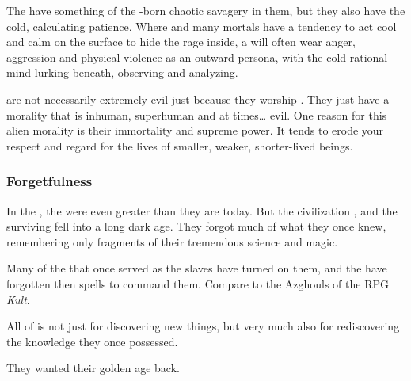 The \dragons{} have something of the \xs-born chaotic savagery in them, but they also have the cold, calculating \ophidian{} patience. 
Where \resphain{} and many mortals have a tendency to act cool and calm on the surface to hide the rage inside, a \dragon{} will often wear anger, aggression and physical violence as an outward persona, with the cold rational mind lurking beneath, observing and analyzing. 

\Dragons{} are not necessarily extremely evil just because they worship \xss. 
They just have a morality that is inhuman, superhuman and at times\ldots{} evil. 
One reason for this alien morality is their immortality and supreme power. 
It tends to erode your respect and regard for the lives of smaller, weaker, shorter-lived beings.




\subsubsection{Forgetfulness}
In the ,
the \dragons{} were even greater than they are today. 
But the \ophidian{} civilization , and the surviving \ophidians{} fell into a long dark age. 
They forgot much of what they once knew, remembering only fragments of their tremendous science and magic.  

Many of the \daemons{} that once served as the \psp{\dragons}{} slaves have turned on them, and the \dragons{} have forgotten then spells to command them. 
Compare to the Azghouls of the RPG \emph{Kult}. 

All of  is not just for discovering new things, but very much also for rediscovering the knowledge they once possessed. 

They wanted their golden age back.






